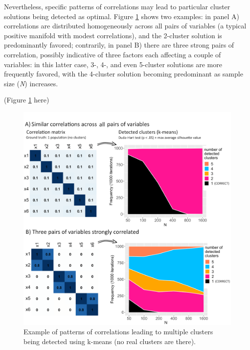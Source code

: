 \documentclass[
  man,floatsintext]{apa6}
\begin{document}
Nevertheless, specific patterns of correlations may lead to particular cluster solutions being detected as optimal. Figure \ref{fig:figure-matrix-correlation} shows two examples: in panel A) correlations are distributed homogeneously across all pairs of variables (a typical positive manifold with modest correlations), and the 2-cluster solution is predominantly favored; contrarily, in panel B) there are three strong pairs of correlation, possibly indicative of three factors each affecting a couple of variables: in this latter case, 3-, 4-, and even 5-cluster solutions are more frequently favored, with the 4-cluster solution becoming predominant as sample size (\emph{N}) increases.

(Figure \ref{fig:figure-matrix-correlation} here)

\begin{figure}

{\centering \includegraphics[width=1\linewidth]{figures_external/Figure_matrix_correlation_REDUCED2} 

}

\caption{Example of patterns of correlations leading to multiple clusters being detected using k-means (no real clusters are there).}\label{fig:figure-matrix-correlation}
\end{figure}
\end{document}
